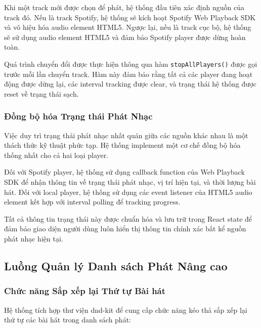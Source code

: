 \documentclass[12pt,a4paper]{article}
\begin{document}
Khi một track mới được chọn để phát, hệ thống đầu tiên xác định nguồn của track đó. Nếu là track Spotify, hệ thống sẽ kích hoạt Spotify Web Playback SDK và vô hiệu hóa audio element HTML5. Ngược lại, nếu là track cục bộ, hệ thống sẽ sử dụng audio element HTML5 và đảm bảo Spotify player được dừng hoàn toàn.

Quá trình chuyển đổi được thực hiện thông qua hàm \texttt{stopAllPlayers()} được gọi trước mỗi lần chuyển track. Hàm này đảm bảo rằng tất cả các player đang hoạt động được dừng lại, các interval tracking được clear, và trạng thái hệ thống được reset về trạng thái sạch.

\subsubsection{Đồng bộ hóa Trạng thái Phát Nhạc}

Việc duy trì trạng thái phát nhạc nhất quán giữa các nguồn khác nhau là một thách thức kỹ thuật phức tạp. Hệ thống implement một cơ chế đồng bộ hóa thống nhất cho cả hai loại player.

Đối với Spotify player, hệ thống sử dụng callback function của Web Playback SDK để nhận thông tin về trạng thái phát nhạc, vị trí hiện tại, và thời lượng bài hát. Đối với local player, hệ thống sử dụng các event listener của HTML5 audio element kết hợp với interval polling để tracking progress.

Tất cả thông tin trạng thái này được chuẩn hóa và lưu trữ trong React state để đảm bảo giao diện người dùng luôn hiển thị thông tin chính xác bất kể nguồn phát nhạc hiện tại.

\subsection{Luồng Quản lý Danh sách Phát Nâng cao}

\subsubsection{Chức năng Sắp xếp lại Thứ tự Bài hát}

Hệ thống tích hợp thư viện dnd-kit để cung cấp chức năng kéo thả sắp xếp lại thứ tự các bài hát trong danh sách phát:
\end{document}
